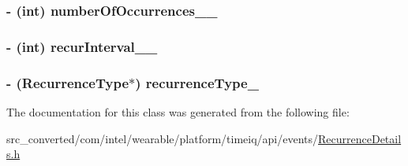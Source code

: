 \subsubsection[{number\+Of\+Occurrences\+\_\+\+\_\+}]{\setlength{\rightskip}{0pt plus 5cm}-\/ (int) number\+Of\+Occurrences\+\_\+\+\_\+}\label{interface_recurrence_details___recurrence_details_builder_a6f2a3c0dc6e69e8383ad62634b454a75}
\hypertarget{interface_recurrence_details___recurrence_details_builder_a0dfb6cf130f3a98395baf1baa17c084f}{}
\subsubsection[{recur\+Interval\+\_\+\+\_\+}]{\setlength{\rightskip}{0pt plus 5cm}-\/ (int) recur\+Interval\+\_\+\+\_\+}\label{interface_recurrence_details___recurrence_details_builder_a0dfb6cf130f3a98395baf1baa17c084f}
\hypertarget{interface_recurrence_details___recurrence_details_builder_a89226fa1b740009de73f937b65a1577d}{}
\subsubsection[{recurrence\+Type\+\_\+}]{\setlength{\rightskip}{0pt plus 5cm}-\/ ({\bf Recurrence\+Type}$\ast$) recurrence\+Type\+\_\+}\label{interface_recurrence_details___recurrence_details_builder_a89226fa1b740009de73f937b65a1577d}


The documentation for this class was generated from the following file\+:\begin{DoxyCompactItemize}
\item 
src\+\_\+converted/com/intel/wearable/platform/timeiq/api/events/\hyperlink{_recurrence_details_8h}{Recurrence\+Details.\+h}\end{DoxyCompactItemize}
